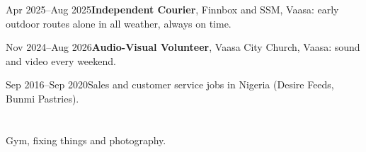 \documentclass[a4paper,11pt]{article}
\begin{document}
\begin{cventry}{Apr 2025--Aug 2025}{\textbf{Independent Courier}, Finnbox and SSM, Vaasa: early outdoor routes alone in all weather, always on time.}
\end{cventry}
\begin{cventry}{Nov 2024--Aug 2026}{\textbf{Audio-Visual Volunteer}, Vaasa City Church, Vaasa: sound and video every weekend.}
\end{cventry}
\begin{cventry}{Sep 2016--Sep 2020}{Sales and customer service jobs in Nigeria (Desire Feeds, Bunmi Pastries).}
\end{cventry}

\section{}
Gym, fixing things and photography.

\section{}
\end{document}
